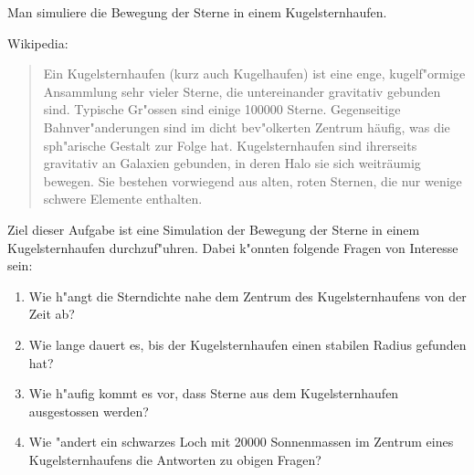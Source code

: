 \begin{aufgabe}
Man simuliere die Bewegung der Sterne in einem Kugelsternhaufen.
\end{aufgabe}

Wikipedia:
\begin{quote}
Ein Kugelsternhaufen (kurz auch Kugelhaufen) ist eine enge,
kugel\-f"ormige Ansammlung sehr vieler Sterne, die untereinander
gravitativ gebunden sind. Typische Gr"ossen sind einige 100000 Sterne.
Gegenseitige Bahnver"anderungen sind im dicht bev"olkerten Zentrum
häufig, was die sph"arische Gestalt zur Folge hat. Kugelsternhaufen
sind ihrerseits gravitativ an Galaxien gebunden, in deren Halo sie
sich weiträumig bewegen. Sie bestehen vorwiegend aus alten, roten
Sternen, die nur wenige schwere Elemente enthalten.
\end{quote}

Ziel dieser Aufgabe ist eine Simulation der Bewegung der Sterne in
einem Kugelsternhaufen durchzuf"uhren. Dabei k"onnten folgende Fragen
von Interesse sein:
\begin{enumerate}
\item Wie h"angt die Sterndichte nahe dem Zentrum des Kugelsternhaufens
von der Zeit ab?
\item Wie lange dauert es, bis der Kugelsternhaufen einen stabilen
Radius gefunden hat?
\item Wie h"aufig kommt es vor, dass Sterne aus dem Kugelsternhaufen
ausgestossen werden?
\item Wie "andert ein schwarzes Loch mit 20000 Sonnenmassen im Zentrum
eines Kugelsternhaufens die Antworten zu obigen Fragen?
\end{enumerate}
